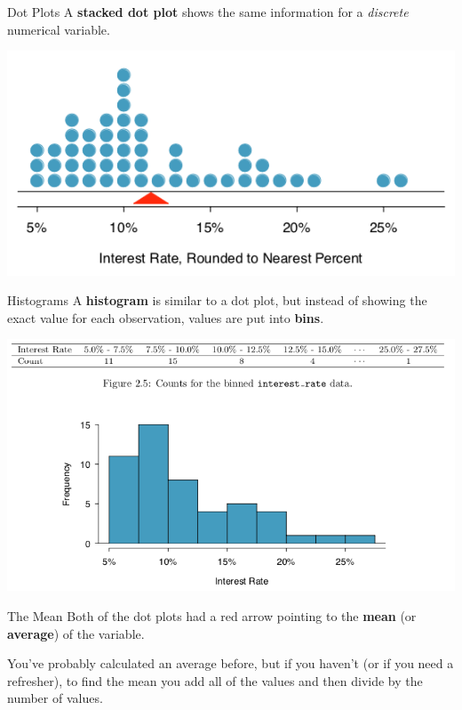 \begin{frame}{Dot Plots}
    A \textbf{stacked dot plot} shows the same information for a \textit{discrete} numerical variable.   
    
    \begin{center}\includegraphics[scale=0.5]{images/dotplot2.png}\end{center}
\end{frame}

\begin{frame}{Histograms}
    A \textbf{histogram} is similar to a dot plot, but instead of showing the exact value for each observation, values are put into \textbf{bins}.
    
    \begin{center}
        \includegraphics[scale=0.4]{images/hist1.png}
    \end{center}
\end{frame}

\begin{frame}{The Mean}
    Both of the dot plots had a red arrow pointing to the \textbf{mean} (or \textbf{average}) of the variable. 
    
    \vspace{12pt}
    You've probably calculated an average before, but if you haven't (or if you need a refresher), to find the mean you add all of the values and then divide by the number of values. 
\end{frame}

